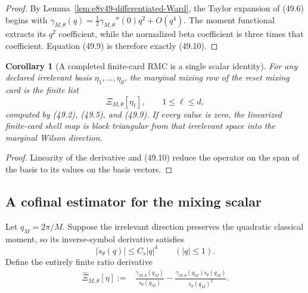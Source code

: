 \documentclass[11pt,oneside]{book}
\newtheorem{corollary}[theorem]{Corollary}
\theoremstyle{definition}
\theoremstyle{remark}
\begin{document}
\begin{proof}
By Lemma~\ref{lem:e8v49-differentiated-Ward}, the Taylor expansion
of (49.6) begins with
\(\dot\gamma_{M,\theta}(q)
=\frac12\dot\gamma_{M,\theta}''(0)q^2+O(q^4)\).
The moment functional extracts its \(q^2\) coefficient, while the
normalized beta coefficient is three times that coefficient.
Equation (49.9) is therefore exactly (49.10).
\end{proof}

\begin{corollary}[A completed finite-card RMC is a single scalar
identity]
\label{cor:e8v49-RMC-scalar}
For any declared irrelevant basis
\(\eta_1,\ldots,\eta_d\), the marginal mixing row of the reset
mixing card is the finite list
\[
 \Xi_{M,\theta}[\eta_\ell],\qquad1\le\ell\le d,               \tag{49.11}
\]
computed by (49.2), (49.5), and (49.9).  If every value is zero,
the linearized finite-card shell map is block triangular from that
irrelevant space into the marginal Wilson direction.
\end{corollary}

\begin{proof}
Linearity of the derivative and (49.10) reduce the operator on the
span of the basis to its values on the basis vectors.
\end{proof}

\subsection{A cofinal estimator for the mixing scalar}

Let \(q_M=2\pi/M\).  Suppose the irrelevant direction preserves the
quadratic classical moment, so its inverse-symbol derivative
satisfies
\[
 |\dot s_\theta(q)|\le C_{\dot s}|q|^4\qquad(|q|\le1).         \tag{49.12}
\]
Define the entirely finite ratio derivative
\[
\begin{split}
 \widehat\Xi_{M,\theta}[\eta]
 :={}&
 \frac{\dot\gamma_{M,\theta}(q_M)}{s_\theta(q_M)}
 -\frac{\gamma_{M,\theta}(q_M)\dot s_\theta(q_M)}
       {s_\theta(q_M)^2}.                                    \tag{49.13}
\end{split}
\]
\end{document}
